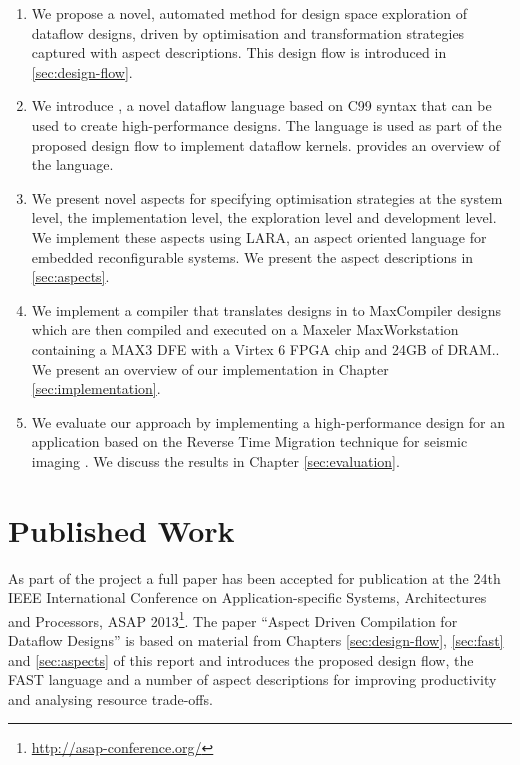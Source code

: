 \begin{enumerate}

\item We propose a novel, automated method for design space
  exploration of dataflow designs, driven by optimisation and
  transformation strategies captured with aspect descriptions. This
  design flow is introduced in \cref{sec:design-flow}.

\item We introduce \FAST{}, a novel dataflow language based on C99
  syntax that can be used to create high-performance designs. The
  language is used as part of the proposed design flow to implement
  dataflow kernels.  provides an overview of the
  \FAST{} language.

\item We present novel aspects for specifying optimisation strategies
  at the system level, the implementation level, the exploration level
  and development level. We implement these aspects using
  LARA, an
  aspect oriented language for embedded reconfigurable systems. We present
  the aspect descriptions in \cref{sec:aspects}.

\item We implement a compiler that translates designs in \FAST{} to
  MaxCompiler designs which are then compiled and
  executed on a Maxeler MaxWorkstation containing a MAX3 DFE with a
  Virtex 6 FPGA chip and 24GB of DRAM.. We present an overview
  of our implementation in Chapter \ref{sec:implementation}.

\item We evaluate our approach by implementing a high-performance
  design for an application based on the Reverse Time Migration
  technique for seismic imaging
  \cite{Xinyu:Qiwei:Luk:Qiang:Pell:2012}. We discuss the results in
  Chapter \ref{sec:evaluation}.
\end{enumerate}

\section{Published Work}

As part of the project a full paper has been accepted for publication
at the 24th IEEE International Conference on Application-specific
Systems, Architectures and Processors, ASAP
2013\footnote{\url{http://asap-conference.org/}}.  The paper ``Aspect
Driven Compilation for Dataflow Designs'' \cite{grigoras2013aspect} is based on
material from Chapters \ref{sec:design-flow}, \ref{sec:fast} and
\ref{sec:aspects} of this report and introduces the proposed design
flow, the FAST language and a number of aspect descriptions for
improving productivity and analysing resource trade-offs.


